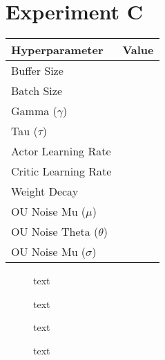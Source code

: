 \section{Experiment C}

\begin{minipage}{0.45\textwidth}
	\centering
	\begin{tabular}{lr}
	\toprule
	\textbf{Hyperparameter} & \textbf{Value} \\
	\midrule
	Buffer Size & \\
	Batch Size & \\
	Gamma ($\gamma$) & \\
	Tau ($\tau$) & \\
	Actor Learning Rate & \\
	Critic Learning Rate & \\
	Weight Decay & \\
	OU Noise Mu ($\mu$) & \\
	OU Noise Theta ($\theta$) & \\
	OU Noise Mu ($\sigma$) & \\
	\bottomrule
	\end{tabular}
\end{minipage}
\hspace{1cm}
\begin{minipage}{0.45\textwidth}
	\centering
\end{minipage}

\begin{figure}[h]
	\begin{minipage}{0.45\textwidth}
		\centering
		
		\caption{text}
		\label{fig:5301_raw_reward}
	\end{minipage}
	\hspace{0.75cm}
	\begin{minipage}{0.45\textwidth}
		\centering
		
		\caption{text}
		\label{fig:5302_average_reward}
	\end{minipage}
\end{figure}

\begin{figure}[h]
	\begin{minipage}{0.45\textwidth}
		\centering
		
		\caption{text}
		\label{fig:5303_frequency_response_1}
	\end{minipage}
	\hspace{0.75cm}
	\begin{minipage}{0.45\textwidth}
		\centering
		
		\caption{text}
		\label{fig:5304_frequency_response_2}
	\end{minipage}
\end{figure}

